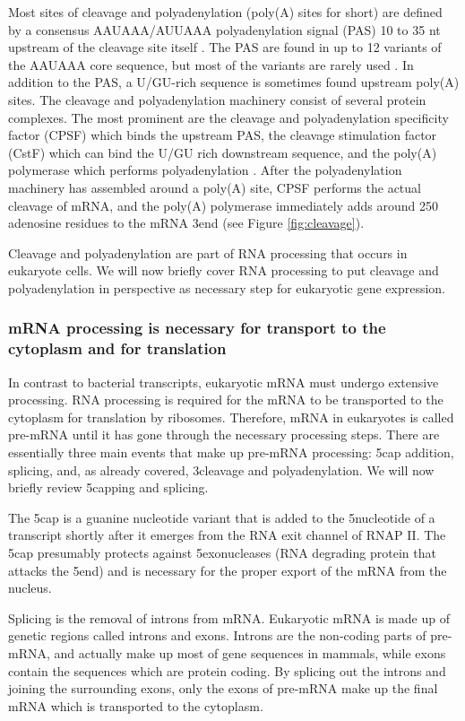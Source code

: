 Most sites of cleavage and polyadenylation (poly(A) sites for short) are
defined by a consensus AAUAAA/AUUAAA polyadenylation signal (PAS) 10 to 35 nt
upstream of the cleavage site itself \cite{proudfoot_ending_2011}. The PAS are
found in up to 12 variants of the AAUAAA core sequence, but most of the
variants are rarely used \cite{beaudoing_patterns_2000}. In addition to the
PAS, a U/GU-rich sequence is sometimes found upstream poly(A) sites. The
cleavage and polyadenylation machinery consist of several protein complexes.
The most prominent are the cleavage and polyadenylation specificity factor
(CPSF) which binds the upstream PAS, the cleavage stimulation factor (CstF)
which can bind the U/GU rich downstream sequence, and the poly(A) polymerase
which performs polyadenylation \cite{lutz_alternative_2008}. After the
polyadenylation machinery has assembled around a poly(A) site, CPSF performs
the actual cleavage of mRNA, and the poly(A) polymerase immediately adds around
250 adenosine residues to the mRNA 3\ppp end (see Figure \ref{fig:cleavage}).

Cleavage and polyadenylation are part of RNA processing that occurs in
eukaryote cells. We will now briefly cover RNA processing to put cleavage and
polyadenylation in perspective as necessary step for eukaryotic gene
expression.

\subsubsection{mRNA processing is necessary for transport to the cytoplasm and
for translation}
In contrast to bacterial transcripts, eukaryotic mRNA must undergo extensive
processing. RNA processing is required for the mRNA to be transported to the
cytoplasm for translation by ribosomes. Therefore, mRNA in eukaryotes is called
pre-mRNA until it has gone through the necessary processing steps. There are
essentially three main events that make up pre-mRNA processing: 5\ppp cap
addition, splicing, and, as already covered, 3\ppp cleavage and
polyadenylation. We will now briefly review 5\ppp capping and splicing.

The 5\ppp cap is a guanine nucleotide variant that is added to the 5\ppp nucleotide
of a transcript shortly after it emerges from the RNA exit channel of RNAP II.
The 5\ppp cap presumably protects against 5\ppp exonucleases (RNA degrading protein
that attacks the 5\ppp end) and is necessary for the proper export of the mRNA
from the nucleus.

Splicing is the removal of introns from mRNA. Eukaryotic mRNA is made up of
genetic regions called introns and exons. Introns are the non-coding parts of
pre-mRNA, and actually make up most of gene sequences in mammals, while exons
contain the sequences which are protein coding. By splicing out the introns and
joining the surrounding exons, only the exons of pre-mRNA make up the final
mRNA which is transported to the cytoplasm.

